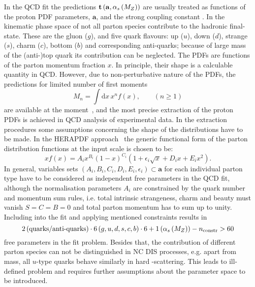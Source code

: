 In the QCD fit the predictions $\mathbf{t}\left( \mathbf{a},\mbox{$\alpha_{s}\left(M_{Z}\right)$}\right)$ are usually treated as functions of the proton PDF parameters, $\mathbf{a}$, and the strong coupling constant \asz. In the kinematic phase space of \hera not all parton species contribute to the hadronic final-state. These are the gluon ($g$), and five quark flavours: up ($u$), down ($d$), strange ($s$), charm ($c$), bottom ($b$) and corresponding anti-quarks; because of large mass of the (anti-)top quark its contribution can be neglected. The PDFs are functions of the parton momentum fraction $x$. In principle, their shape is a calculable quantity in QCD. However, due to non-perturbative nature of the PDFs, the predictions for limited number of first moments 
\begin{equation}
 M_n=\int\mathrm{d}x\,x^n f\left(x\right), \qquad (n\ge1)
\end{equation}
are available at the moment~\cite{Hagler:2009ni}, and the most precise extraction of the proton PDFs is achieved in QCD analysis of experimental data. In the extraction procedures some assumptions concerning the shape of the distributions have to be made. In the HERAPDF approach~\cite{Aaron:2009aa} the generic functional form of the parton distribution functions at the input scale is chosen to be:
\begin{equation}
 xf\left(x\right) = A_ix^{B_i}\left(1-x\right)^{C_i}\left(1+\epsilon_i\sqrt{x}+D_ix+E_ix^2\right).
 \label{eq:pdfansatz}
\end{equation}
In general, variables sets $\left(A_i,B_i,C_i,D_i,E_i,\epsilon_i\right)\subset\mathbf{a}$ for each individual parton type have to be considered as independent free parameters in the QCD fit, although the normalisation parameters $A_i$ are constrained by the quark number and momentum sum rules, i.e. total intrinsic strangeness, charm and beauty must vanish $S=C=B=0$ and total parton momentum has to sum up to unity. Including \asz into the fit and applying mentioned constraints results in 
\begin{equation}
2 \left( \text{quarks/anti-quarks}\right)\cdot 6\left(g,u,d,s,c,b\right)\cdot 6 + 1\left(\mbox{$\alpha_{s}\left(M_{Z}\right)$}\right) - n_\text{constr} > 60
\end{equation}
free parameters in the fit problem. Besides that, the contribution of different parton species can not be distinguished in NC DIS processes, e.g. apart from mass, all $u$-type quarks behave similarly in hard \ep-scattering. 
This leads to ill-defined problem and requires further assumptions about the parameter space to be introduced. 

